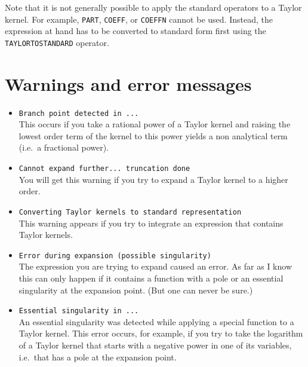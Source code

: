 Note that it is not generally possible to apply the standard \REDUCE{}
operators to a Taylor kernel. For example, \verb|PART|, \verb|COEFF|,
or \verb|COEFFN| cannot be used. Instead, the expression at hand has
to be converted to standard form first using the \verb|TAYLORTOSTANDARD|
operator.

\section{Warnings and error messages}
\begin{itemize}

\item \verb|Branch point detected in ...|\\
    This occurs if you take a rational power of a Taylor kernel
    and raising the lowest order term of the kernel to this
    power yields a non analytical term (i.e.\ a fractional power).

\item \verb|Cannot expand further... truncation done|\\
    You will get this warning if you try to expand a Taylor kernel to
    a higher order.

\item \verb|Converting Taylor kernels to standard representation|\\
    This warning appears if you try to integrate an expression that
    contains Taylor kernels.

\item \verb|Error during expansion (possible singularity)|\\
    The expression you are trying to expand caused an error.
    As far as I know this can only happen if it contains a function
    with a pole or an essential singularity at the expansion point.
    (But one can never be sure.)

\item \verb|Essential singularity in ...|\\
    An essential singularity was detected while applying a
    special function to a Taylor kernel.
    This error occurs, for example, if you try to take
    the logarithm of a Taylor kernel that starts with a negative
    power in one of its variables, i.e.\ that has a pole
    at the expansion point.


\end{itemize}
